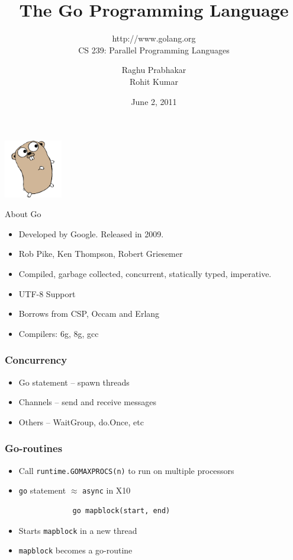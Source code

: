 \documentclass{beamer}
\title{The Go Programming Language}
\subtitle{http://www.golang.org \\ CS 239: Parallel Programming Languages}
\author{Raghu Prabhakar \\ Rohit Kumar}
\date{June 2, 2011}
\begin{document}
\begin{frame}
\begin{center}
\includegraphics[width=1in]{gopher.png}
\end{center}
\titlepage
\end{frame}

\begin{frame} {About Go}
\begin{itemize}
  \item Developed by Google. Released in 2009.
  \item Rob Pike, Ken Thompson, Robert Griesemer
  \item Compiled, garbage collected, concurrent, statically typed,
    imperative. 
  \item UTF-8 Support
  \item Borrows from CSP, Occam and Erlang
  \item Compilers: 6g, 8g, gcc 
\end{itemize}
\end{frame}

\begin{frame}[fragile]
\frametitle{Concurrency}
  \begin{itemize}
    \item Go statement -- spawn threads
    \item Channels -- send and receive messages
    \item Others -- WaitGroup, do.Once, etc    
  \end{itemize}
\end{frame}

\begin{frame} [fragile]
\frametitle{Go-routines}
\begin{itemize}
  \item Call \verb=runtime.GOMAXPROCS(n)= to run on multiple processors
  \item \verb=go= statement $\approx$ \verb=async= in X10
\end{itemize}
\begin{center}
\begin{verbatim}
                go mapblock(start, end)
\end{verbatim}
\end{center}
\begin{itemize}
\item Starts \verb=mapblock= in a new thread
\item \verb=mapblock= becomes a go-routine
\end{itemize}

\end{frame}
\end{document}
